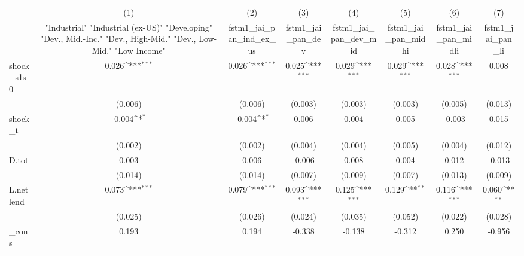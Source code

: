 {
\def\sym#1{\ifmmode^{#1}\else\(^{#1}\)\fi}
\begin{tabular}{l*{7}{c}}
\toprule
            &\multicolumn{1}{c}{(1)}&\multicolumn{1}{c}{(2)}&\multicolumn{1}{c}{(3)}&\multicolumn{1}{c}{(4)}&\multicolumn{1}{c}{(5)}&\multicolumn{1}{c}{(6)}&\multicolumn{1}{c}{(7)}\\
            &\multicolumn{1}{c}{ "Industrial" "Industrial (ex-US)" "Developing" "Dev., Mid.-Inc." "Dev., High-Mid."  "Dev., Low-Mid." "Low Income" }&\multicolumn{1}{c}{fstm1\_jai\_pan\_ind\_ex\_us}&\multicolumn{1}{c}{fstm1\_jai\_pan\_dev}&\multicolumn{1}{c}{fstm1\_jai\_pan\_dev\_mid}&\multicolumn{1}{c}{fstm1\_jai\_pan\_midhi}&\multicolumn{1}{c}{fstm1\_jai\_pan\_midli}&\multicolumn{1}{c}{fstm1\_jai\_pan\_li}\\
\midrule
shock\_s1s0  &       0.026\sym{***}&       0.026\sym{***}&       0.025\sym{***}&       0.029\sym{***}&       0.029\sym{***}&       0.028\sym{***}&       0.008         \\
            &     (0.006)         &     (0.006)         &     (0.003)         &     (0.003)         &     (0.003)         &     (0.005)         &     (0.013)         \\
\addlinespace
shock\_t     &      -0.004\sym{*}  &      -0.004\sym{*}  &       0.006         &       0.004         &       0.005         &      -0.003         &       0.015         \\
            &     (0.002)         &     (0.002)         &     (0.004)         &     (0.004)         &     (0.005)         &     (0.004)         &     (0.012)         \\
\addlinespace
D.tot       &       0.003         &       0.006         &      -0.006         &       0.008         &       0.004         &       0.012         &      -0.013         \\
            &     (0.014)         &     (0.014)         &     (0.007)         &     (0.009)         &     (0.007)         &     (0.013)         &     (0.009)         \\
\addlinespace
L.netlend   &       0.073\sym{***}&       0.079\sym{***}&       0.093\sym{***}&       0.125\sym{***}&       0.129\sym{**} &       0.116\sym{***}&       0.060\sym{**} \\
            &     (0.025)         &     (0.026)         &     (0.024)         &     (0.035)         &     (0.052)         &     (0.022)         &     (0.028)         \\
\addlinespace
\_cons      &       0.193         &       0.194         &      -0.338         &      -0.138         &      -0.312         &       0.250         &      -0.956         \\

\end{tabular}}
